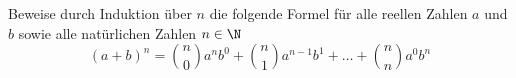 \begin{prob}
  Beweise durch Induktion über $n$ die folgende Formel für alle reellen Zahlen
  $a$ und $b$ sowie alle natürlichen Zahlen $n \in \N$
  \begin{equation*}
    (a+b)^n
    =
    \binom{n}{0}  a^n b^0 + \binom{n}{1} a^{n-1} b^1 + \ldots + \binom{n}{n} a^0 b^n
  \end{equation*}
\end{prob}
